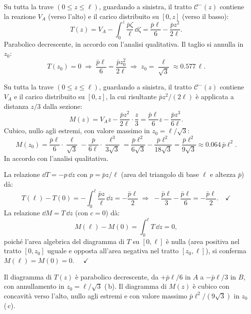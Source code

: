 \begin{esempio}
\begin{svolgimento}
		
		Su tutta la trave $(0 \leq z \leq \ell)$,
		guardando a sinistra, il tratto $\mathcal{C}^-(z)$
		contiene la reazione $V_A$ (verso l'alto) e il
		carico distribuito su $[0,z]$ (verso il basso):
		\[
		T(z) = V_A - \int_0^z \frac{\bar{p}\zeta}{\ell}\,\dd\zeta
		= \frac{\bar{p}\ell}{6} - \frac{\bar{p}z^2}{2\ell}.
		\]
		Parabolico decrescente, in accordo con l'analisi
		qualitativa. Il taglio si annulla in $z_0$:
		\[
		T(z_0) = 0
		\;\Rightarrow\;
		\frac{\bar{p}\ell}{6} = \frac{\bar{p}z_0^2}{2\ell}
		\;\Rightarrow\;
		z_0 = \frac{\ell}{\sqrt{3}} \approx 0.577\,\ell.
		\]
		
		
		Su tutta la trave $(0 \leq z \leq \ell)$,
		guardando a sinistra, il tratto $\mathcal{C}^-(z)$
		contiene $V_A$ e il carico distribuito su $[0,z]$,
		la cui risultante $\bar{p}z^2/(2\ell)$ è applicata
		a distanza $z/3$ dalla sezione:
		\[
		M(z) = V_A z - \frac{\bar{p}z^2}{2\ell}\cdot\frac{z}{3}
		= \frac{\bar{p}\ell}{6}z - \frac{\bar{p}z^3}{6\ell}.
		\]
		Cubico, nullo agli estremi, con valore massimo
		in $z_0 = \ell/\sqrt{3}$:
		\[
		M(z_0) = \frac{\bar{p}\ell}{6}\cdot\frac{\ell}{\sqrt{3}}
		- \frac{\bar{p}}{6\ell}\cdot\frac{\ell^3}{3\sqrt{3}}
		= \frac{\bar{p}\ell^2}{6\sqrt{3}}
		- \frac{\bar{p}\ell^2}{18\sqrt{3}}
		= \frac{\bar{p}\ell^2}{9\sqrt{3}}
		\approx 0.064\,\bar{p}\ell^2.
		\]
		In accordo con l'analisi qualitativa.
		
		La relazione $\dd T = -p\,\dd z$ con $p = \bar{p}z/\ell$
		(area del triangolo di base $\ell$ e altezza $\bar{p}$)
		dà:
		\[
		T(\ell) - T(0) = -\int_0^\ell \frac{\bar{p}z}{\ell}\,\dd z
		= -\frac{\bar{p}\ell}{2}
		\;\Rightarrow\;
		-\frac{\bar{p}\ell}{3} - \frac{\bar{p}\ell}{6}
		= -\frac{\bar{p}\ell}{2}. \quad\checkmark
		\]
		La relazione $\dd M = T\,\dd z$ (con $c = 0$) dà:
		\[
		M(\ell) - M(0) = \int_0^\ell T\,\dd z = 0,
		\]
		poiché l'area algebrica del diagramma di $T$
		su $[0,\ell]$ è nulla (area positiva nel tratto
		$[0,z_0]$ uguale e opposta all'area negativa
		nel tratto $[z_0,\ell]$), si conferma
		$M(\ell) = M(0) = 0$. $\quad\checkmark$
		
		\noindent
		Il diagramma di $T(z)$ è parabolico decrescente,
		da $+\bar{p}\ell/6$ in $A$ a $-\bar{p}\ell/3$
		in $B$, con annullamento in $z_0 = \ell/\sqrt{3}$ (\,b).
		Il diagramma di $M(z)$ è cubico con concavità
		verso l'alto, nullo agli estremi e con valore
		massimo $\bar{p}\ell^2/(9\sqrt{3})$ in $z_0$ (\,c).
	\end{svolgimento}
\end{esempio}


